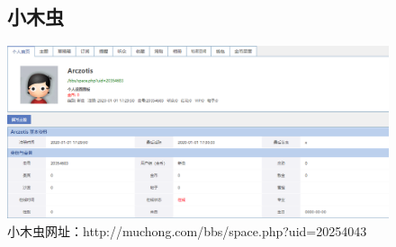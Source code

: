 \documentclass{article}
\begin{document}
\begin{itemize}
\begin{figure}[htb!]
\item\subsection{小木虫}
\centering
\includegraphics[scale=0.25]{xiaomuchong}
\caption{小木虫网址：http://muchong.com/bbs/space.php?uid=20254043}
\label{fig:xiaomuchong}
\end{figure}

\end{itemize}
\end{document}
